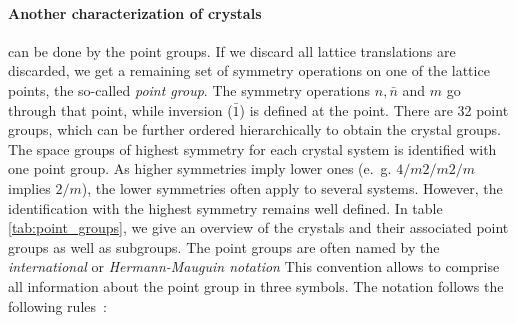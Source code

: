 \paragraph{Another characterization of crystals} 
can be done by the point groups. 
If we discard all lattice translations are discarded, we get 
a remaining set of symmetry operations on one of the lattice points, 
the so-called \emph{point group}. The symmetry operations $n, \bar{n}$ and $m$  
go through that point, while inversion ($\bar{1}$) is defined at the point. 
There are 32 point groups, which can be further ordered hierarchically to obtain 
the crystal groups. 
The space groups of highest symmetry for each crystal system is identified 
with one point group. As higher symmetries 
imply lower ones (e.~g. $4/m 2/m 2/m$ implies $2/m$), the lower 
symmetries often apply to several systems. However, the identification 
with the highest symmetry remains well defined. In table \ref{tab:point_groups}, 
we give an overview of the crystals and their associated point groups as 
well as subgroups.
The point groups are often named by 
the \emph{international} or \emph{Hermann-Mauguin notation} 
This convention allows to comprise all information about the point group in 
three symbols.
The notation follows the following rules~\cite{sands1993introduction}:
